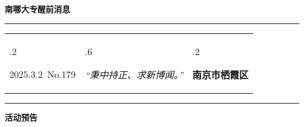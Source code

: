 \documentclass[letterpaper, 12pt]{article}
\begin{document}
\begin{center}
    \Huge\textbf{南哪大专醒前消息}
\end{center}
\vspace{4mm}
\hrule
\renewcommand\tabularxcolumn[1]{m{#1}}
\begin{tabularx}{\textwidth}{>{\hsize.2\hsize}X>{\hsize.6\hsize}X>{\hsize.2\hsize}X}
    \begin{flushleft}
        2025.3.2\, No.179
    \end{flushleft}
    &
    \begin{center}
        \textit{“秉中持正、求新博闻。”}
    \end{center}
    &
    \begin{flushright}
        \textbf{南京市栖霞区}
    \end{flushright}
\end{tabularx}
\vspace{-3.5mm}
\hrule
\vspace{4mm}
\centerline{\huge\textbf{活动预告}}
\end{document}
